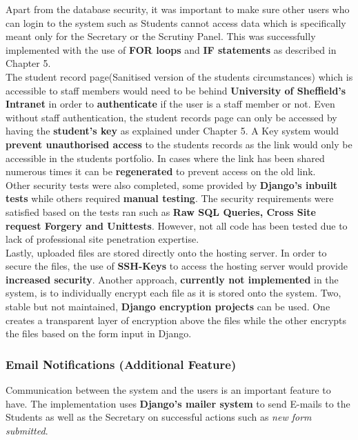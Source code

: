 \documentclass[../main.tex]{subfiles}
\begin{document}
Apart from the database security, it was important to make sure other users who can login to the system such as Students cannot access data which is specifically meant only for the Secretary or the Scrutiny Panel. This was successfully implemented with the use of \textbf{FOR loops} and \textbf{IF statements} as described in Chapter 5. \\[4mm]

The student record page(Sanitised version of the students circumstances) which is accessible to staff members would need to be behind \textbf{University of Sheffield's Intranet} in order to \textbf{authenticate} if the user is a staff member or not. Even without staff authentication, the student records page can only be accessed by having the \textbf{student's key} as explained under Chapter 5. A Key system would \textbf{prevent unauthorised access} to the students records as the link would only be accessible in the students portfolio. In cases where the link has been shared numerous times it can be \textbf{regenerated} to prevent access on the old link.\\[4mm]

Other security tests were also completed, some provided by \textbf{Django's inbuilt tests} while others required \textbf{manual testing}. The security requirements were satisfied based on the tests ran such as \textbf{Raw SQL Queries, Cross Site request Forgery and Unittests}. However, not all code has been tested due to lack of professional site penetration expertise. \\[4mm]

Lastly, uploaded files are stored directly onto the hosting server. In order to secure the files, the use of \textbf{SSH-Keys} to access the hosting server would provide \textbf{increased security}. Another approach, \textbf{currently not implemented} in the system, is to individually encrypt each file as it is stored onto the system. Two, stable but not maintained, \textbf{Django encryption projects} can be used. One creates a transparent layer of encryption above the files\cite{danielquinn} while the other encrypts the files based on the form input in Django\cite{ruddra}. 

\subsubsection{Email Notifications (Additional Feature)}
Communication between the system and the users is an important feature to have. The implementation uses \textbf{Django's mailer system} to send E-mails to the Students as well as the Secretary on successful actions such as \textit{new form submitted}.
\end{document}
